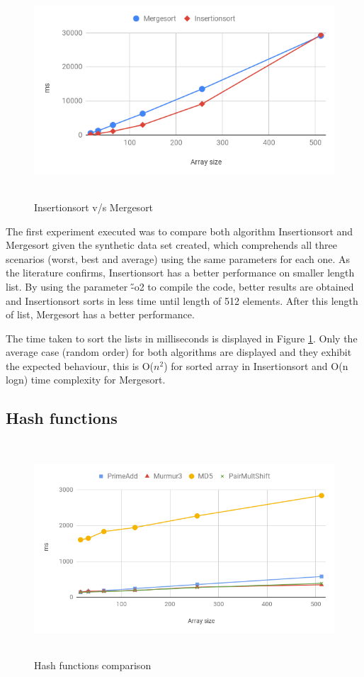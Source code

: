 \documentclass[a4paper,12pt]{article}
\begin{document}
\begin{figure}[H]
    \centering
     \includegraphics[height=8cm,keepaspectratio]{./images/InsertionvsMerge.png}
    \caption{Insertionsort v/s Mergesort}
    \label{fig:InsrtVsMerge}
\end{figure}

The first experiment executed was to compare both algorithm Insertionsort and Mergesort given the synthetic data set created, which comprehends all three scenarios (worst, best and average) using the same parameters for each one. As the literature confirms, Insertionsort has a better performance on smaller length list. By using the parameter {\H -o2}  to compile the code, better results are obtained and Insertionsort sorts in less time until length of 512 elements. After this length of list, Mergesort has a better performance.

The time taken to sort the lists in milliseconds is displayed in Figure \ref{fig:InsrtVsMerge}. Only the average case (random order) for both algorithms are displayed and they exhibit the expected behaviour, this is  O(${n}^2$) for sorted array in Insertionsort and O(n logn) time complexity for Mergesort.

\subsection{Hash functions}

\begin{figure}[H]
    \centering
    \includegraphics[height=8cm,keepaspectratio]{./images/hashes.png}
    \caption{Hash functions comparison}
    \label{fig:HashesFunc}
\end{figure}
\end{document}
